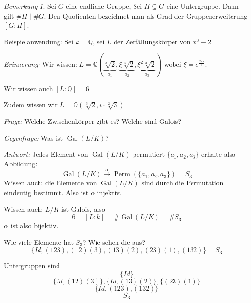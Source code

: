 \documentclass[a4paper,12pt,numbers=noenddot,parskip=full]{scrartcl}
\newcommand{\setQ}{\mathbb{Q}}
\newcommand{\heading}{\underline}
\DeclareMathOperator{\Gal}{Gal}
\theoremstyle{dotless}
\theoremstyle{remark}
\newtheorem*{remark}{Bemerkung}
\begin{document}
	\begin{remark}
		Sei $G$ eine endliche Gruppe, Sei $H \subseteq G$ eine Untergruppe. Dann gilt $\#H \mid \#G$. Den Quotienten bezeichnet man als Grad der Gruppenerweiterung $[G:H]$.
	\end{remark}

	\heading{Beispielanwendung:} Sei $k = \setQ$, sei $L$ der Zerfällungskörper von $x^3 - 2$.
	
	\textit{Erinnerung:} Wir wissen: $L = \setQ(\underbrace{\sqrt[3]{2}}_{a_1}, \underbrace{\xi \sqrt[3]{2}}_{a_2}, \underbrace{\xi^2 \sqrt[3]{2}}_{a_3})$ wobei $\xi = e^{\frac{2 \pi i}{3}}$.
	
	Wir wissen auch $[L: \setQ] = 6$
	
	Zudem wissen wir $L = \setQ(\sqrt[3]{2}, i \cdot \sqrt[2]{3})$
	
	\textit{Frage:} Welche Zwischenkörper gibt es? Welche sind Galois?
	
	\textit{Gegenfrage:} Was ist $\Gal(L/K)$?
	
	\textit{Antwort:} Jedes Element von $\Gal(L/K)$ permutiert $\{ a_1, a_2, a_3 \}$ erhalte also Abbildung:
	\begin{equation*}
		\Gal(L/K) \overset{\alpha}{\to} \operatorname{Perm}(\{ a_1, a_2, a_3 \}) = S_3
	\end{equation*}
	Wissen auch: die Elemente von $\Gal(L/K)$ sind durch die Permutation eindeutig bestimmt. Also ist $\alpha$ injektiv.
	
	Wissen auch: $L/K$ ist Galois, also
	\begin{equation*}
		6 = [L:k] = \#\Gal(L/K) = \#S_3
	\end{equation*}
	$\alpha$ ist also bijektiv.
	
	Wie viele Elemente hat $S_3$? Wie sehen die aus?
	\begin{equation*}
		\{ Id, (123), (12)(3), (13)(2), (23)(1), (132) \} = S_3
	\end{equation*}
	
	Untergruppen sind
	\begin{equation*}
		\{ Id \}
	\end{equation*}
	\begin{equation*}
		\{ Id, (12)(3) \}, \{ Id, (13)(2) \}, \{ (23)(1) \}
	\end{equation*}
	\begin{equation*}
		\{ Id, (123), (132) \}
	\end{equation*}
	\begin{equation*}
		S_3
	\end{equation*}
	
\end{document}
